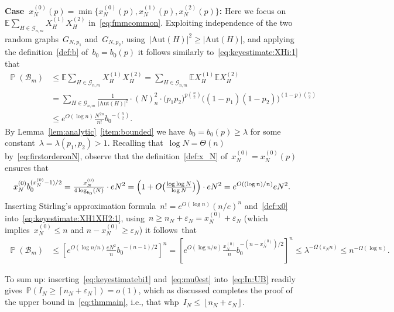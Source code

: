 \documentclass{article}
\newcommand{\eps}{\varepsilon}
\renewcommand{\Pr}{\mathbb{P}}
\newcommand{\E}{\mathbb{E}}
\newcommand{\cG}{\mathcal{G}}
\newcommand\abs[1]{\left|#1\right|}
\newcommand\floor[1]{\left\lfloor #1 \right \rfloor}
\newcommand\ceil[1]{\left\lceil #1 \right \rceil}
\newcommand{\xone}{x^{(1)}}
\newcommand{\xtwo}{x^{(2)}}
\newcommand{\xot}{x^{(0)}}
\newcommand{\Xone}{X^{(1)}}
\newcommand{\Xtwo}{X^{(2)}}
\newcommand{\nN}{n_N}
\newcommand{\eve}{\mathcal{B}}
\newcommand{\Aut}{\mathrm{Aut}}
\DeclareMathOperator{\pr}{\mathbb{P}}
\newcommand\bigpar[1]{\bigl(#1\bigr)}
\newcommand\Bigpar[1]{\Bigl(#1\Bigr)}
\newcommand\lrsqpar[1]{\left[#1\right]}
\newcommand\bigcpar[1]{\bigl\{#1\bigr\}}
\begin{document}
\textbf{Case~$x^{(0)}_N(p)=\min\bigcpar{\xot_N(p),\xone_N(p),\xtwo_N(p)}$:}
Here we focus on~$\E\sum_{H\in \mathcal{G}_{n,m}} \Xone_H\Xtwo_H$ in~\eqref{eq:fmmcommon}.
Exploiting independence of the two random graphs~$G_{N,p_1}$ and~$G_{N,p_2}$, using~$\abs{\Aut(H)}^2 \ge \abs{\Aut(H)}$, 
and applying the definition~\eqref{def:b} of~$b_0=b_0(p)$ it follows similarly to~\eqref{eq:keyestimate:XHi:1} that 
\begin{equation}\label{eq:keyestimate:XH1XH2:1}
 \begin{split}
    \pr(\eve_m) 
    & \le \E\sum_{H\in \mathcal{G}_{n,m}} \Xone_H\Xtwo_H = \sum_{H\in \mathcal{G}_{n,m}} \E\Xone_H \E\Xtwo_H \\
    & = 
    \sum_{H \in \cG_{n,m}} \frac{1}{\abs{\Aut(H)}^2}
    \cdot (N)_n^2 \cdot  \bigpar{p_1p_2}^{p\binom{n}{2}} \bigpar{(1-p_1)(1-p_2)}^{(1-p)\binom{n}{2}}\\
    & \leq e^{O(\log n)} \frac{N^{2n}}{n!} {b_0}^{-\binom{n}{2}} .
 \end{split}
 \end{equation}
By Lemma~\ref{lem:analytic}~\ref{item:bounded} we have~$b_0=b_0(p)\ge \lambda$ for some constant~${\lambda=\lambda(p_1,p_2)>1}$.
Recalling that~$\log N = \Theta(n)$ by~\eqref{eq:firstorderonN}, observe that the definition~\eqref{def:x_N} of~$x^{(0)}_N = x^{(0)}_N(p)$ ensures that
\begin{equation}\label{def:x0}
x^{(0)}_N b_0^{(x^{(0)}_N-1)/2} = \tfrac{x^{(0)}_N}{4 \log_{b_0}(N)} 
 \cdot e N^2 
 = \Bigpar{1+O\bigpar{\tfrac{\log \log N}{\log N}}} \cdot  eN^2 
= e^{O( (\log n)/n)} e N^2.
\end{equation}
Inserting Stirling's approximation formula~$n! = e^{O(\log n)}(n/e)^{n}$ and~\eqref{def:x0} into~\eqref{eq:keyestimate:XH1XH2:1}, 
using~$n \ge \nN+\eps_N = x_N^{(0)} + \eps_N$ (which implies~$x_N^{(0)} \le n$ and $n-x_N^{(0)} \geq \eps_N$) it follows~that
\begin{equation}\label{eq:mu0est}
\begin{split}
    \pr(\eve_m)& \le \lrsqpar{e^{O(\log n/n)}  \tfrac{e N^2}{n} {b_0}^{-(n-1)/{2}}  }^n 
=  \lrsqpar{e^{O(\log n/n)}\tfrac{x^{(0)}_N}{n} b_0^{-(n-x^{(0)}_N)/2}}^n \le \lambda^{-\Omega(\eps_Nn)} \le n^{-\Omega(\log n)} .
\end{split}
\end{equation}


To sum up: inserting~\eqref{eq:keyestimatebi1} and~\eqref{eq:mu0est} into~\eqref{eq:In:UB} readily gives~$\Pr(I_N \ge \ceil{\nN+\eps_N})=o(1)$, 
which as discussed completes the proof of the upper bound in~\eqref{eq:thmmain}, i.e., that whp~$I_N \le  \floor{\nN+\eps_N}$.
\end{document}
